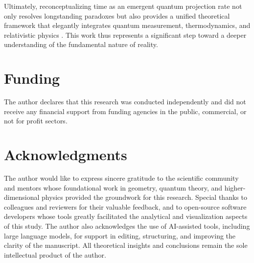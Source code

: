 \documentclass[12pt,a4paper]{article}
\numberwithin{equation}{section}
\begin{document}
Ultimately, reconceptualizing time as an emergent quantum projection rate not only resolves longstanding paradoxes but also provides a unified theoretical framework that elegantly integrates quantum measurement, thermodynamics, and relativistic physics \cite{penrose_emperor_1989,oppenheim_time_2019}. This work thus represents a significant step toward a deeper understanding of the fundamental nature of reality.



\section*{Funding}
The author declares that this research was conducted independently and did not receive any financial support from funding agencies in the public, commercial, or not for profit sectors.

\section*{Acknowledgments}
The author would like to express sincere gratitude to the scientific community and mentors whose foundational work in geometry, quantum theory, and higher-dimensional physics provided the groundwork for this research. Special thanks to colleagues and reviewers for their valuable feedback, and to open-source software developers whose tools greatly facilitated the analytical and visualization aspects of this study. The author also acknowledges the use of AI-assisted tools, including large language models, for support in editing, structuring, and improving the clarity of the manuscript. All theoretical insights and conclusions remain the sole intellectual product of the author.
\end{document}
